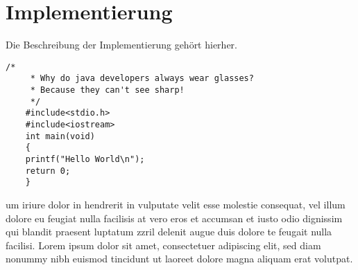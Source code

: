 \chapter{Implementierung}
\label{cha:implementierung}

Die Beschreibung der Implementierung gehört hierher.
\lstset{language=CPP}
\begin{lstlisting}[caption={They dont see the Code}]
	/*
	 * Why do java developers always wear glasses?
	 * Because they can't see sharp!
	 */
    #include<stdio.h>
    #include<iostream>
    int main(void)
    {
    printf("Hello World\n");
    return 0;
    }
\end{lstlisting}

um iriure dolor in hendrerit in vulputate velit esse molestie consequat, vel illum dolore eu feugiat nulla facilisis at vero eros et accumsan et iusto odio dignissim qui blandit praesent luptatum zzril delenit augue duis dolore te feugait nulla facilisi. Lorem ipsum dolor sit amet, consectetuer adipiscing elit, sed diam nonummy nibh euismod tincidunt ut laoreet dolore magna aliquam erat volutpat.